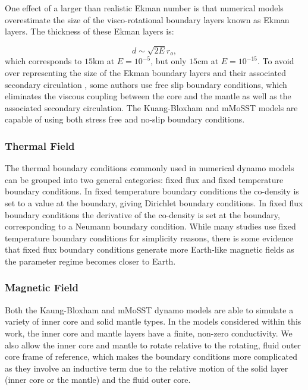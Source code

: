 One effect of a larger than realistic Ekman number is that numerical models overestimate the size of the visco-rotational boundary layers known as Ekman layers. The thickness of these Ekman layers is:

\begin{equation}
d\sim \sqrt{2E} r_{o},
\end{equation}
which corresponds to $15$km at $E=10^{-5}$, but only $15$cm at $E=10^{-15}$. To avoid over representing the size of the Ekman boundary layers and their associated secondary circulation \citep{gubbins2007}, some authors \citep{kuangandbloxham1999} use free slip boundary conditions, which eliminates the viscous coupling between the core and the mantle as well as the associated secondary circulation. The Kuang-Bloxham and mMoSST models are capable of using both stress free and no-slip boundary conditions. 

\subsubsection{Thermal Field}
The thermal boundary conditions commonly used in numerical dynamo models can be grouped into two general categories: fixed flux and fixed temperature boundary conditions. In fixed temperature boundary conditions the co-density is set to a value at the boundary, giving Dirichlet boundary conditions. In fixed flux boundary conditions the derivative of the co-density is set at the boundary, corresponding to a Neumann boundary condition. While many studies use fixed temperature boundary conditions for simplicity reasons, there is some evidence \citep{sakuraba2009} that fixed flux boundary conditions generate more Earth-like magnetic fields as the parameter regime becomes closer to Earth.

\subsubsection{Magnetic Field}
Both the Kaung-Bloxham and mMoSST dynamo models are able to simulate a variety of inner core and solid mantle types. In the models considered within this work, the inner core and mantle layers have a finite, non-zero conductivity. We also allow the inner core and mantle to rotate relative to the rotating, fluid outer core frame of reference, which makes the boundary conditions more complicated as they involve an inductive term due to the relative motion of the solid layer (inner core or the mantle) and the fluid outer core.


